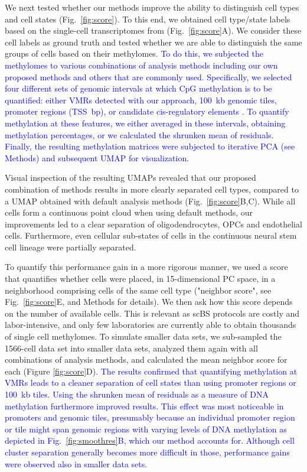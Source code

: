 \documentclass[twocolumn,10pt]{article}
\newcommand{\new}[1]{\textcolor{blue}{#1}}
\begin{document}
We next tested whether our methods improve the ability to distinguish cell types and cell states (Fig.~\ref{fig:score}).
To this end, we obtained cell type/state labels based on the single-cell transcriptomes from \citet{kremer_scnmt} (Fig.~\ref{fig:score}A).
We consider these cell labels as ground truth and tested whether we are able to distinguish the same groups of cells based on their methylomes.
\new{
To do this, we subjected the methylomes to various combinations of analysis methods including our own proposed methods and others that are commonly used.
Specifically, we selected four different sets of genomic intervals at which CpG methylation is to be quantified:
either VMRs detected with our approach, 100~kb genomic tiles, promoter regions (TSS\textpm2000~bp), or candidate cis-regulatory elements \citep[ENCODE cCREs,][]{encode2020expanded}.
To quantify methylation at these features, we either averaged in these intervals, obtaining methylation percentages, or we calculated the shrunken mean of residuals.
Finally, the resulting methylation matrices were subjected to iterative PCA (see Methods) and subsequent UMAP for visualization.
}

Visual inspection of the resulting UMAPs revealed that our proposed combination of methods results in more clearly separated cell types, compared to a UMAP obtained with default analysis methods (Fig.~\ref{fig:score}B,C).
While all cells form a continuous point cloud when using default methods, our improvements led to a clear separation of oligodendrocytes, OPCs and endothelial cells.
Furthermore, even cellular sub-states of cells in the continuous neural stem cell lineage were partially separated.

To quantify this performance gain in a more rigorous manner, we used a score that quantifies whether cells were placed, in 15-dimensional PC space, in a neighborhood comprising cells of the same cell type ("neighbor score", see Fig.~\ref{fig:score}E, and Methods for details).
We then ask how this score depends on the number of available cells.
This is relevant as scBS protocols are costly and labor-intensive, and only few laboratories are currently able to obtain thousands of single cell methylomes.
To simulate smaller data sets, we sub-sampled the 1566-cell data set into smaller data sets, analyzed them again with all combinations of analysis methods, and calculated the mean neighbor score for each (Figure \ref{fig:score}D).
\new{
The results confirmed that quantifying methylation at VMRs leads to a cleaner separation of cell states than using promoter regions or 100~kb tiles.
Using the shrunken mean of residuals as a measure of DNA methylation furthermore improved results.
This effect was most noticeable in promoters and genomic tiles, presumably because an individual promoter region or tile might span genomic regions with varying levels of DNA methylation as depicted in Fig.~\ref{fig:smoothres}B, which our method accounts for.
Although cell cluster separation generally becomes more difficult in those, performance gains were observed also in smaller data sets.
}
\end{document}
